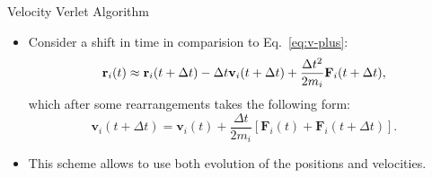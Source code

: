 \documentclass[10pt]{beamer}
\begin{document}
\begin{frame}{Velocity Verlet Algorithm}
\begin{itemize}
\setlength\itemsep{1em}
  \item Consider a shift in time in comparision to Eq.~\ref{eq:v-plus}:
  \begin{equation}
    {\bf r}_i(t) \approx {\bf r}_i(t+\Delta t) - \Delta t \mathbf{v}_i(t+\Delta t) + \frac{\Delta t^2}{2m_i}\mathbf{F}_i(t+\Delta t),
  \end{equation}
  which after some rearrangements takes the following form:
  \begin{equation}
    \mathbf{v}_i(t+\Delta t) = \mathbf{v}_i(t) + \frac{\Delta t}{2m_i}\left[ \mathbf{F}_i(t) + \mathbf{F}_i(t+\Delta t) \right].
  \end{equation}

  \item This scheme allows to use both evolution of the positions and velocities.
\end{itemize}
\end{frame}




\end{document}
